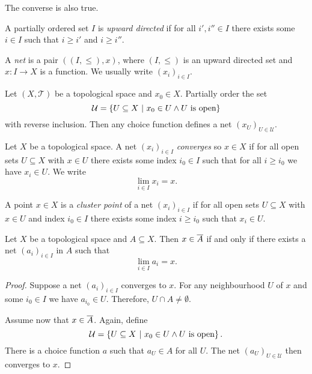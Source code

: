 \begin{opomba}
The converse is also true.
\end{opomba}

\begin{definicija}
A partially ordered set $I$ is
\emph{upward directed} if for all
$i', i'' \in I$ there exists some $i \in I$ such that $i \geq i'$
and $i \geq i''$.
\end{definicija}

\begin{definicija}
A \emph{net} is a pair $((I, \leq), x)$, where
$(I, \leq)$ is an upward directed set and $x \colon I \to X$ is a
function. We usually write $(x_i)_{i \in I}$.
\end{definicija}

\begin{opomba}
Let $(X, \mathcal{T})$ be a topological space and $x_0 \in X$.
Partially order the set
\[
\mathcal{U} =
\left\{U \subseteq X~\middle\vert~x_0 \in U \land \text{$U$ is open}\right\}
\]
with reverse inclusion. Then any choice function defines a net
$(x_U)_{U \in \mathcal{U}}$.
\end{opomba}

\begin{definicija}
Let $X$ be a topological space. A net $(x_i)_{i \in I}$
\emph{converges} so $x \in X$ if for all open
sets $U \subseteq X$ with $x \in U$ there exists some index
$i_0 \in I$ such that for all $i \geq i_0$ we have $x_i \in U$. We
write
\[
\lim_{i \in I} x_i = x.
\]
\end{definicija}

\begin{definicija}
A point $x \in X$ is a \emph{cluster point} of
a net $(x_i)_{i \in I}$ if for all open sets $U \subseteq X$ with
$x \in U$ and index $i_0 \in I$ there exists some index
$i \geq i_0$ such that $x_i \in U$.
\end{definicija}

\begin{trditev}
Let $X$ be a topological space and $A \subseteq X$. Then
$x \in \overline{A}$ if and only if there exists a net
$(a_i)_{i \in I}$ in $A$ such that
\[
\lim_{i \in I} a_i = x.
\]
\end{trditev}

\begin{proof}
Suppose a net $(a_i)_{i \in I}$ converges to $x$. For any
neighbourhood $U$ of $x$ and some $i_0 \in I$ we have
$a_{i_0} \in U$. Therefore, $U \cap A \ne \emptyset$.

Assume now that $x \in \overline{A}$. Again, define
\[
\mathcal{U} =
\left\{U \subseteq X~\middle\vert~x_0 \in U \land \text{$U$ is open}\right\}.
\]
There is a choice function $a$ such that $a_U \in A$ for all $U$.
The net $(a_U)_{U \in \mathcal{U}}$ then converges to $x$.
\end{proof}

